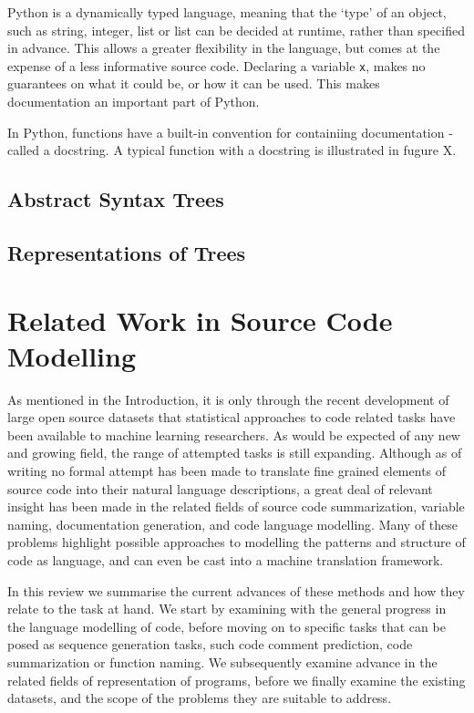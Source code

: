 Python is a dynamically typed language, meaning that the `type' of an object, such as string, integer, list or list can be decided at runtime, rather than specified in advance.
This allows a greater flexibility in the language, but comes at the expense of a less informative source code.
Declaring a variable \texttt{x}, makes no guarantees on what it could be, or how it can be used. 
This makes documentation an important part of Python.

In Python, functions have a built-in convention for containiing documentation - called a docstring. A typical function with a docstring is illustrated in fugure X.


\subsection{Abstract Syntax Trees} %
\label{sub:abstract_syntax_trees}

\subsection{Representations of Trees}


\section{Related Work in Source Code Modelling}

As mentioned in the Introduction, it is only through the recent development of large open source datasets that statistical approaches to code related tasks have been available to machine learning researchers. 
As would be expected of any new and growing field, the range of attempted tasks is still expanding. 
Although as of writing no formal attempt has been made to translate fine grained elements of source code into their natural language descriptions, a great deal of relevant insight has been made in the related fields of source code summarization, variable naming, documentation generation, and code language modelling. Many of these problems highlight possible approaches to modelling the patterns and structure of code as language, and can even be cast into a machine translation framework.  

In this review we summarise the current advances of these methods and how they relate to the task at hand.  We start by examining with the general progress in the language modelling of code, before moving on to specific tasks that can be posed as sequence generation tasks, such code comment prediction, code summarization or function naming. We subsequently examine advance in the related fields of representation of programs, before we finally examine the existing datasets, and the scope of the problems they are suitable to address. 

